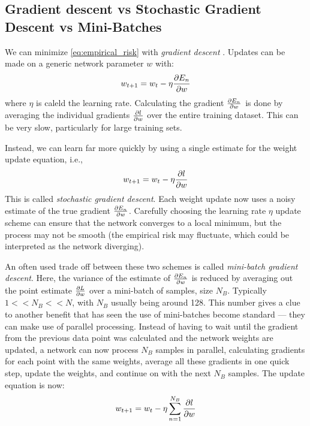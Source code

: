 \subsection{Gradient descent vs Stochastic Gradient Descent vs Mini-Batches}
  We can minimize \autoref{eq:empirical_risk} with \emph{gradient descent}
  \citep{rumelhart_parallel_1986}. Updates can be made on a generic network
  parameter $w$ with:
  \begin{equation}
    w_{t+1} = w_{t} - \eta \frac{\partial E_n}{\partial w}
  \end{equation}
  where $\eta$ is caleld the learning rate. Calculating the gradient
  $\frac{\partial E_n}{\partial w}$ is done by averaging the individual gradients
  $\frac{\partial l}{\partial w}$ over the entire training dataset. This can be very slow,
  particularly for large training sets.
  
  Instead, we can learn far more quickly by using a single estimate for the
  weight update equation, i.e., 
  \begin{equation}
    w_{t+1} = w_{t} - \eta \frac{\partial l}{\partial w}
  \end{equation}
  This is called \emph{stochastic gradient descent}. Each weight update now
  uses a noisy estimate of the true gradient $\frac{\partial E_n}{\partial w}$. Carefully
  choosing the learning rate $\eta$ update scheme can ensure that the network
  converges to a local minimum, but the process may not be smooth (the
  empirical risk may fluctuate, which could be interpreted as the network
  diverging).

  An often used trade off between these two schemes is called \emph{mini-batch
  gradient descent}. Here, the variance of the estimate of $\frac{\partial E_n}{\partial w}$ is
  reduced by averaging out the point estimate $\frac{\partial L}{\partial w}$ over a mini-batch
  of samples, size $N_B$. Typically $1 << N_B << N$, with $N_B$ usually being
  around 128. This number gives a clue to another benefit that has seen the use
  of mini-batches become standard --- they can make use of parallel processing.
  Instead of having to wait until the gradient from the previous data point was
  calculated and the network weights are updated, a network can now process
  $N_B$ samples in parallel, calculating gradients for each point with the same
  weights, average all these gradients in one quick step, update the weights,
  and continue on with the next $N_B$ samples. The update equation is now:
  \begin{equation}
    w_{t+1} = w_{t} - \eta \sum_{n=1}^{N_B} \frac{\partial l}{\partial w}
  \end{equation}

